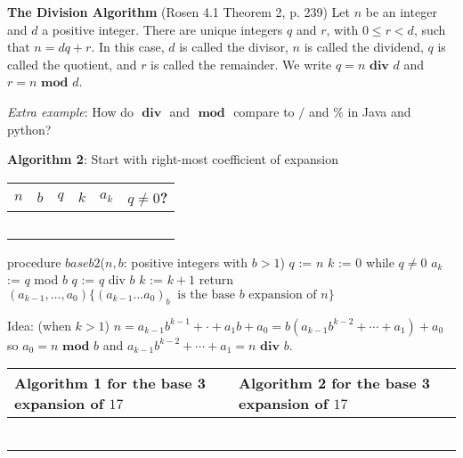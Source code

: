 \documentclass[12pt, oneside]{article}
\begin{document}
 {\bf The Division Algorithm} (Rosen 4.1 Theorem 2, p. 239) Let $n$ be an integer 
and $d$ a positive integer. There are unique integers $q$ and $r$, with $0 \leq r < d$, such that 
$n = dq + r$. In this case, $d$ is called the divisor, $n$ is called the dividend, $q$ is called the quotient, 
and $r$ is called the remainder. We write $q=n \textbf{ div } d$ and $r=n \textbf{ mod } d$.

\textit{Extra example}: How do $\textbf{ div }$ and $\textbf{ mod }$ compare to $/$ and $\%$ in Java and python?


{\bf Algorithm 2}: Start with right-most coefficient of expansion

\begin{multicols}{2}
\begin{minipage}{3.2in}
\begin{tabular}{c|c|c|c|c|c}
$n$ & $b$  & $q$ & $k$ & $a_k$ & $q \neq 0$?\\
\hline 
\phantom{~$17$~} & \phantom{~$3$~} & \phantom{~$17$~} & \phantom{~$0$~} & \phantom{~~~} & \phantom{~T~}\\
\phantom{~$17$~} & \phantom{~$3$~} & \phantom{~$5$~} & \phantom{~$1$~} & \phantom{~$a_0 = 2$~} & \phantom{~T~}\\
\phantom{~$17$~} & \phantom{~$3$~} & \phantom{~$1$~} & \phantom{~$2$~} & \phantom{~$a_1 = 2$~} & \phantom{~T~}\\
\phantom{~$17$~} & \phantom{~$3$~} & \phantom{~$0$~} & \phantom{~$3$~} & \phantom{~$a_2 = 1$~} & \phantom{~F~}\\
&&&&&\\
\end{tabular}
\end{minipage}
\columnbreak
\begin{algorithm}[caption={Calculating base $b$ expansion, from right}]
procedure $\textit{baseb2}$($n, b$: positive integers with $b > 1$)
$q$ := $n$
$k$ := $0$
while $q  \neq 0$
  $a_{k}$ := $q$ mod $b$
  $q$ := $q$ div $b$
  $k$ := $k+1$
return $(a_{k-1}, \ldots, a_0) \{(a_{k-1} \ldots a_0)_b~\textrm{ is the base } b \textrm{ expansion of } n \}$
\end{algorithm}

Idea: {\tiny(when $k > 1$)} $n = a_{k-1} b^{k-1} + \cdot+ a_1 b + a_0 = b ( a_{k-1} b^{k-2} + \cdots + a_1) + a_0$
so $a_0 = n \textbf{ mod } b$ and $a_{k-1} b^{k-2} + \cdots + a_1 = n \textbf{ div } b$.
\end{multicols}


\begin{center}
\begin{tabular}{p{3.3in}|p{3.3in}}
Algorithm 1 for the base 3 expansion of $17$ &Algorithm 2 for the base 3 expansion of $17$  \\
\hline
 & \\
 & \\
 & \\
 & \\
  & \\
 & \\
\end{tabular}
\end{center}
\end{document}
